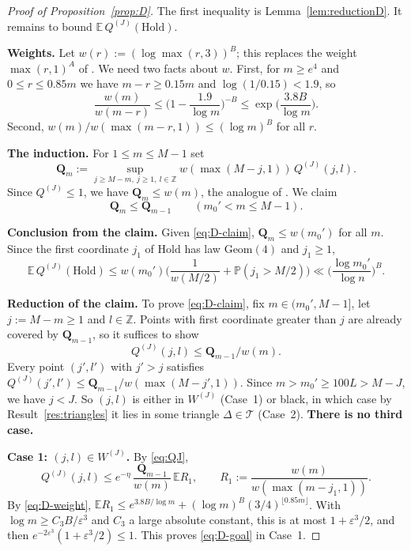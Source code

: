 \documentclass[11pt]{amsart}
\theoremstyle{remark}
\newcommand{\E}{\mathbb{E}}
\renewcommand{\P}{\mathbb{P}}
\newcommand{\Z}{\mathbb{Z}}
\newcommand{\Hold}{\mathrm{Hold}}
\newcommand{\Geom}{\mathrm{Geom}}
\newcommand{\T}[1]{\cite[#1]{Tao22}}   %
\theoremstyle{plain}
\begin{document}
\begin{proof}[Proof of Proposition~\ref{prop:D}]
The first inequality is Lemma~\ref{lem:reductionD}. It remains to bound $\E\,Q^{(J)}(\Hold)$.

\textbf{Weights.} Let $w(r):=(\log\max(r,3))^B$; this replaces the weight $\max(r,1)^A$ of \T{(7.37)--(7.38)}. We need two facts about $w$. First, for $m\ge e^4$ and $0\le r\le0.85m$ we have $m-r\ge0.15m$ and $\log(1/0.15)<1.9$, so
\begin{equation}\label{eq:D-weight}
\frac{w(m)}{w(m-r)}\le\Big(1-\frac{1.9}{\log m}\Big)^{-B}\le\exp\Big(\frac{3.8B}{\log m}\Big).
\end{equation}
Second, $w(m)/w(\max(m-r,1))\le(\log m)^B$ for all $r$.

\textbf{The induction.} For $1\le m\le M-1$ set
\[
\mathbf Q_m:=\sup_{j\ge M-m,\ j\ge1,\ l\in\Z}w(\max(M-j,1))\,Q^{(J)}(j,l).
\]
Since $Q^{(J)}\le1$, we have $\mathbf Q_m\le w(m)$, the analogue of \T{(7.39)}. We claim
\begin{equation}\label{eq:D-claim}
\mathbf Q_m\le\mathbf Q_{m-1}\qquad(m_0'<m\le M-1).
\end{equation}

\textbf{Conclusion from the claim.} Given \eqref{eq:D-claim}, $\mathbf Q_m\le w(m_0')$ for all $m$. Since the first coordinate $j_1$ of $\Hold$ has law $\Geom(4)$ and $j_1\ge1$,
\[
\E\,Q^{(J)}(\Hold)\le w(m_0')\Big(\frac1{w(M/2)}+\P(j_1>M/2)\Big)\ll\Big(\frac{\log m_0'}{\log n}\Big)^B .
\]

\textbf{Reduction of the claim.} To prove \eqref{eq:D-claim}, fix $m\in(m_0',M-1]$, let $j:=M-m\ge1$ and $l\in\Z$. Points with first coordinate greater than $j$ are already covered by $\mathbf Q_{m-1}$, so it suffices to show
\begin{equation}\label{eq:D-goal}
Q^{(J)}(j,l)\le\mathbf Q_{m-1}/w(m).
\end{equation}
Every point $(j',l')$ with $j'>j$ satisfies $Q^{(J)}(j',l')\le\mathbf Q_{m-1}/w(\max(M-j',1))$. Since $m>m_0'\ge100L>M-J$, we have $j<J$. So $(j,l)$ is either in $W^{(J)}$ (Case~1) or black, in which case by Result~\ref{res:triangles} it lies in some triangle $\Delta\in\mathcal T$ (Case~2). \textbf{There is no third case.}

\textbf{Case 1: $(j,l)\in W^{(J)}$.} By \eqref{eq:QJ},
\[
Q^{(J)}(j,l)\le e^{-\eta}\,\frac{\mathbf Q_{m-1}}{w(m)}\,\E R_1,\qquad R_1:=\frac{w(m)}{w(\max(m-j_1,1))}.
\]
By \eqref{eq:D-weight}, $\E R_1\le e^{3.8B/\log m}+(\log m)^B(3/4)^{\lfloor0.85m\rfloor}$. With $\log m\ge C_3B/\varepsilon^3$ and $C_3$ a large absolute constant, this is at most $1+\varepsilon^3/2$, and then $e^{-2\varepsilon^3}(1+\varepsilon^3/2)\le1$. This proves \eqref{eq:D-goal} in Case~1.


\end{proof}
\end{document}
